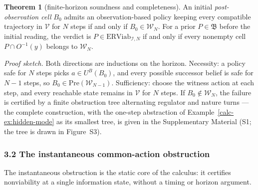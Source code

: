 \documentclass[10pt,twocolumn]{article}
\theoremstyle{definition}
\newtheorem{theorem}{Theorem}
\begin{document}
\begin{theorem}[finite-horizon soundness and completeness]\label{calc-thm:finite-horizon}
An initial \emph{post-observation cell} \(B_0\) admits an observation-based
policy keeping every compatible trajectory in \(\mathcal V\) for
\(N\) steps if and only if \(B_0\in\mathcal W_N\). For a prior
\(P\in\mathfrak B\) before the initial reading, the verdict is
\(P\in\mathrm{ERViab}_{\mathcal I,N}\) if and only if every
nonempty cell \(P\cap O^{-1}(y)\) belongs to \(\mathcal W_N\).
\end{theorem}

\emph{Proof sketch.} Both directions are inductions on the horizon. Necessity: a policy safe for \(N\) steps picks \(a \in U^B(B_0)\), and every possible successor belief is safe for \(N - 1\) steps, so \(B_0 \in \mathrm{Pre}(\mathcal{W}_{N-1})\). Sufficiency: choose the witness action at each step, and every reachable state remains in \(\mathcal{V}\) for \(N\) steps. If \(B_0 \notin \mathcal{W}_N\), the failure is certified by a finite obstruction tree alternating regulator and nature turns --- the complete construction, with the one-step abstraction of Example~\ref{calc-ex:hidden-mode} as its smallest tree, is given in the Supplementary Material (S1; the tree is drawn in Figure~S3).

\subsubsection{3.2 The instantaneous common-action
obstruction}\label{calc-the-instantaneous-common-action-obstruction}

The instantaneous obstruction is the static core of the calculus: it certifies nonviability at a single information state, without a timing or horizon argument.
\end{document}
